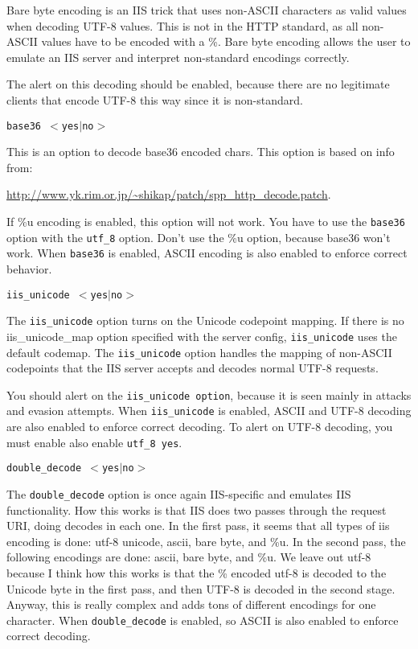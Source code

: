 \documentclass[english]{report}
\newcounter{slistnum}
\newenvironment{slist}
{ \begin{list}{ {\bf \arabic{slistnum}.} }{\usecounter{slistnum} } }
{ \end{list} }
\begin{document}
\begin{slist}
Bare byte encoding is an IIS trick that uses non-ASCII characters as valid
values when decoding UTF-8 values.  This is not in the HTTP standard, as all
non-ASCII values have to be encoded with a \%.  Bare byte encoding allows the
user to emulate an IIS server and interpret non-standard encodings correctly.

The alert on this decoding should be enabled, because there are no legitimate
clients that encode UTF-8 this way since it is non-standard.

\item \texttt{base36 $<$yes$|$no$>$}

This is an option to decode base36 encoded chars.  This option is based on
info from:

\url{http://www.yk.rim.or.jp/~shikap/patch/spp\_http\_decode.patch}.

If \%u encoding is enabled, this option will not work.  You have to use the
\texttt{base36} option with the \texttt{utf\_8} option.  Don't use the \%u
option, because base36 won't work.  When \texttt{base36} is enabled, ASCII
encoding is also enabled to enforce correct behavior.

\item \texttt{iis\_unicode $<$yes$|$no$>$}

The \texttt{iis\_unicode} option turns on the Unicode codepoint mapping.  If
there is no iis\_unicode\_map option specified with the server config,
\texttt{iis\_unicode} uses the default codemap.  The \texttt{iis\_unicode}
option handles the mapping of non-ASCII codepoints that the IIS server accepts
and decodes normal UTF-8 requests.

You should alert on the \texttt{iis\_unicode option}, because it is seen mainly
in attacks and evasion attempts.  When \texttt{iis\_unicode} is enabled, ASCII
and UTF-8 decoding are also enabled to enforce correct decoding.  To alert on
UTF-8 decoding, you must enable also enable \texttt{utf\_8 yes}. 

\item \texttt{double\_decode $<$yes$|$no$>$}

The \texttt{double\_decode} option is once again IIS-specific and emulates IIS
functionality.  How this works is that IIS does two passes through the request
URI, doing decodes in each one.  In the first pass, it seems that all types of
iis encoding is done: utf-8 unicode, ascii, bare byte, and \%u.  In the second
pass, the following encodings are done:  ascii, bare byte, and \%u.  We leave
out utf-8 because I think how this works is that the \% encoded utf-8 is
decoded to the Unicode byte in the first pass, and then UTF-8 is decoded in the
second stage.  Anyway, this is really complex and adds tons of different
encodings for one character.  When \texttt{double\_decode} is enabled, so ASCII
is also enabled to enforce correct decoding.


\end{slist}
\end{document}
